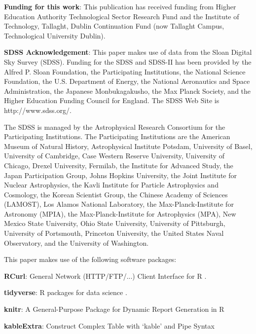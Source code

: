 \documentclass{aa}
\begin{document}
\begin{acknowledgements}
\textbf{Funding for this work}: This publication has received funding from Higher Education Authority Technological Sector Research Fund and the Institute of Technology, Tallaght, Dublin Continuation Fund (now Tallaght Campus, Technological University Dublin).

\textbf{SDSS Acknowledgement}: This paper makes use of data from the Sloan Digital Sky Survey (SDSS).  Funding for the SDSS and SDSS-II has been provided by the Alfred P. Sloan Foundation, the Participating Institutions, the National Science Foundation, the U.S. Department of Energy, the National Aeronautics and Space Administration, the Japanese Monbukagakusho, the Max Planck Society, and the Higher Education Funding Council for England. The SDSS Web Site is http://www.sdss.org/.

The SDSS is managed by the Astrophysical Research Consortium for the Participating Institutions. The Participating Institutions are the American Museum of Natural History, Astrophysical Institute Potsdam, University of Basel, University of Cambridge, Case Western Reserve University, University of Chicago, Drexel University, Fermilab, the Institute for Advanced Study, the Japan Participation Group, Johns Hopkins University, the Joint Institute for Nuclear Astrophysics, the Kavli Institute for Particle Astrophysics and Cosmology, the Korean Scientist Group, the Chinese Academy of Sciences (LAMOST), Los Alamos National Laboratory, the Max-Planck-Institute for Astronomy (MPIA), the Max-Planck-Institute for Astrophysics (MPA), New Mexico State University, Ohio State University, University of Pittsburgh, University of Portsmouth, Princeton University, the United States Naval Observatory, and the University of Washington.

This paper makes use of the following software packages:

\textbf{RCurl}: General Network (HTTP/FTP/...) Client Interface for R \citep{rcurl}.

\textbf{tidyverse}: R packages for data science \citep{tidyverse}.

\textbf{knitr}: A General-Purpose Package for Dynamic Report Generation in R \citep{knitr1,knitr2,knitr3}

\textbf{kableExtra}: Construct Complex Table with `kable' and Pipe Syntax \citep{kableExtra}

\end{acknowledgements}

\end{document}
